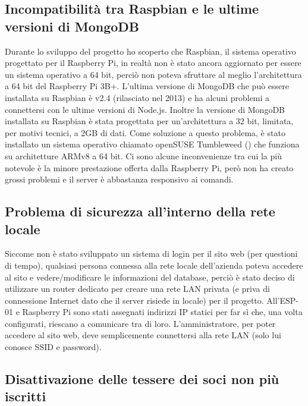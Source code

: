 \documentclass[12pt]{report}
\begin{document}
%
\subsection{Incompatibilità tra Raspbian e le ultime versioni di MongoDB}
%
Durante lo sviluppo del progetto ho scoperto che Raspbian, il sistema operativo progettato per il Raspberry Pi, in realtà non è stato ancora aggiornato per essere un sistema operativo a 64 bit, perciò non poteva sfruttare al meglio l'architettura a 64 bit del Raspberry Pi 3B+.
L'ultima versione di MongoDB che può essere installata su Raspbian è v2.4 (rilasciato nel 2013) e ha alcuni problemi a connettersi con le ultime versioni di Node.js. Inoltre la versione di MongoDB installata su Raspbian è stata progettata per un'architettura a 32 bit, limitata, per motivi tecnici, a 2GB di dati\cite{mongodb_32bit_limitations}.
Come soluzione a questo problema, è stato installato un sistema operativo chiamato openSUSE Tumbleweed (\cite{tumbleweed}) che funziona su architetture ARMv8 a 64 bit. Ci sono alcune inconvenienze tra cui la più notevole è la minore prestazione offerta dalla Raspberry Pi, però non ha creato grossi problemi e il server è abbastanza responsivo ai comandi. 

%
\subsection{Problema di sicurezza all'interno della rete locale}
%
Siccome non è stato sviluppato un sistema di login per il sito web (per questioni di tempo), qualsiasi persona connessa alla rete locale dell'azienda poteva accedere al sito e vedere/modificare le informazioni del database, perciò è stato deciso di utilizzare un router dedicato per creare una rete LAN privata (e priva di connessione Internet dato che il server risiede in locale) per il progetto. All'ESP-01 e Raspberry Pi sono stati assegnati indirizzi IP statici per far sì che, una volta configurati, riescano a comunicare tra di loro. L'amministratore, per poter accedere al sito web, deve semplicemente connettersi alla rete LAN (solo lui conosce SSID e password).


%
\subsection{Disattivazione delle tessere dei soci non più iscritti}
%
\end{document}
